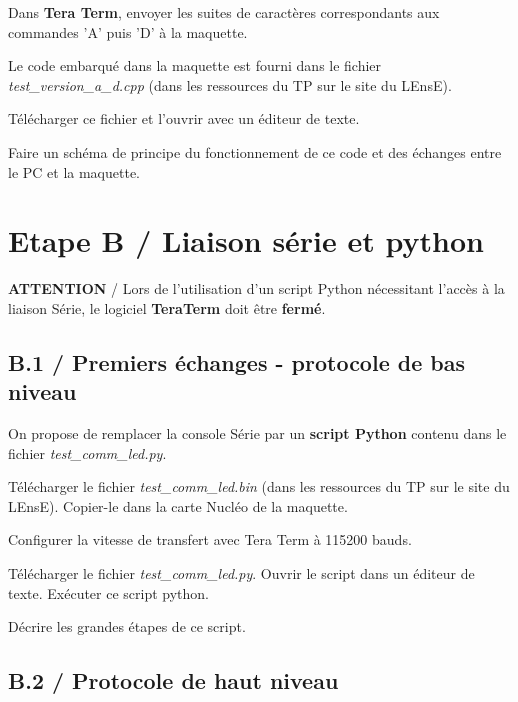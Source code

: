 \documentclass[a4paper,11pt,titlepage]{article} %
\begin{document}
\Manip Dans \textbf{Tera Term}, envoyer les suites de caractères correspondants aux commandes 'A' puis 'D' à la maquette.

\medskip

Le code embarqué dans la maquette est fourni dans le fichier \textsl{test\_version\_a\_d.cpp} (dans les ressources du TP sur le site du LEnsE). 

\Manip Télécharger ce fichier et l'ouvrir avec un éditeur de texte.

\Quest Faire un schéma de principe du fonctionnement de ce code et des échanges entre le PC et la maquette.

\newpage
\section{Etape B / Liaison série et python}


\begin{mdframed}[style=sidebar,frametitle={}]
\large
\textbf{ATTENTION} / Lors de l'utilisation d'un script Python nécessitant l'accès à la liaison Série, le logiciel \textbf{TeraTerm} doit être \textbf{fermé}.
\end{mdframed}

\subsection{B.1 / Premiers échanges - protocole de bas niveau}


On propose de remplacer la console Série par un \textbf{script Python} contenu dans le fichier \textsl{test\_comm\_led.py}.

\Manip Télécharger le fichier \textsl{test\_comm\_led.bin} (dans les ressources du TP sur le site du LEnsE). Copier-le dans la carte Nucléo de la maquette.

\Manip Configurer la vitesse de transfert avec Tera Term à 115200 bauds.

\medskip

\Manip Télécharger le fichier \textsl{test\_comm\_led.py}. Ouvrir le script dans un éditeur de texte. Exécuter ce script python.

\medskip

\Quest Décrire les grandes étapes de ce script.


\subsection{B.2 / Protocole de haut niveau}
\end{document}
